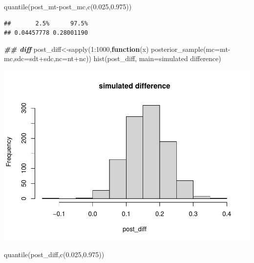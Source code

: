 \documentclass[
]{book}
\newenvironment{Shaded}{\begin{snugshade}}{\end{snugshade}}
\newcommand{\AttributeTok}[1]{\textcolor[rgb]{0.77,0.63,0.00}{#1}}
\newcommand{\ControlFlowTok}[1]{\textcolor[rgb]{0.13,0.29,0.53}{\textbf{#1}}}
\newcommand{\DecValTok}[1]{\textcolor[rgb]{0.00,0.00,0.81}{#1}}
\newcommand{\DocumentationTok}[1]{\textcolor[rgb]{0.56,0.35,0.01}{\textbf{\textit{#1}}}}
\newcommand{\FloatTok}[1]{\textcolor[rgb]{0.00,0.00,0.81}{#1}}
\newcommand{\FunctionTok}[1]{\textcolor[rgb]{0.00,0.00,0.00}{#1}}
\newcommand{\NormalTok}[1]{#1}
\newcommand{\OtherTok}[1]{\textcolor[rgb]{0.56,0.35,0.01}{#1}}
\newcommand{\SpecialCharTok}[1]{\textcolor[rgb]{0.00,0.00,0.00}{#1}}
\newcommand{\StringTok}[1]{\textcolor[rgb]{0.31,0.60,0.02}{#1}}
\theoremstyle{definition}
\theoremstyle{definition}
\theoremstyle{definition}
\theoremstyle{definition}
\theoremstyle{remark}
\begin{document}
\begin{Shaded}
\begin{Highlighting}[]
         \FunctionTok{quantile}\NormalTok{(post\_mt}\SpecialCharTok{{-}}\NormalTok{post\_mc,}\FunctionTok{c}\NormalTok{(}\FloatTok{0.025}\NormalTok{,}\FloatTok{0.975}\NormalTok{))}
\end{Highlighting}
\end{Shaded}

\begin{verbatim}
##       2.5%      97.5% 
## 0.04457778 0.28001190
\end{verbatim}

\begin{Shaded}
\begin{Highlighting}[]
  \DocumentationTok{\#\# diff}
\NormalTok{         post\_diff}\OtherTok{\textless{}{-}}\FunctionTok{sapply}\NormalTok{(}\DecValTok{1}\SpecialCharTok{:}\DecValTok{1000}\NormalTok{,}\ControlFlowTok{function}\NormalTok{(x) }\FunctionTok{posterior\_sample}\NormalTok{(}\AttributeTok{mc=}\NormalTok{mt}\SpecialCharTok{{-}}\NormalTok{mc,}\AttributeTok{sdc=}\NormalTok{sdt}\SpecialCharTok{+}\NormalTok{sdc,}\AttributeTok{nc=}\NormalTok{nt}\SpecialCharTok{+}\NormalTok{nc))}
    \FunctionTok{hist}\NormalTok{(post\_diff, }\AttributeTok{main=}\StringTok{\textquotesingle{}simulated difference\textquotesingle{}}\NormalTok{)}
\end{Highlighting}
\end{Shaded}

\includegraphics{_main_files/figure-latex/unnamed-chunk-32-2.pdf}

\begin{Shaded}
\begin{Highlighting}[]
             \FunctionTok{quantile}\NormalTok{(post\_diff,}\FunctionTok{c}\NormalTok{(}\FloatTok{0.025}\NormalTok{,}\FloatTok{0.975}\NormalTok{))}
\end{Highlighting}
\end{Shaded}
\end{document}
